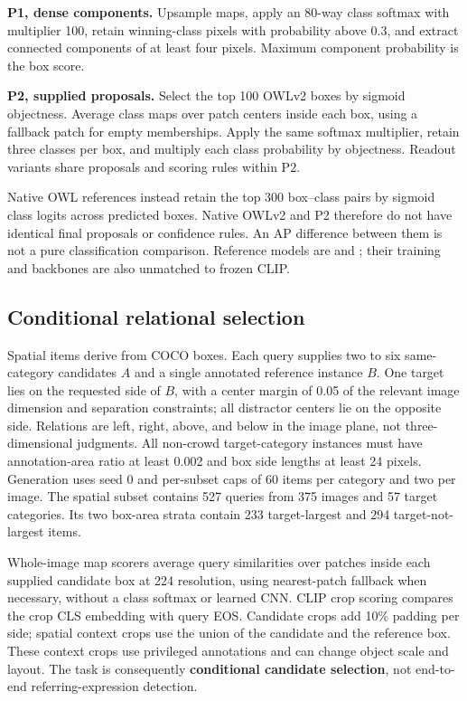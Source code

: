 \documentclass[10pt,twocolumn,letterpaper]{article}
\begin{document}
\textbf{P1, dense components.} Upsample maps, apply an 80-way class
softmax with multiplier 100, retain winning-class pixels with
probability above 0.3, and extract connected components of at least four
pixels. Maximum component probability is the box score.

\textbf{P2, supplied proposals.} Select the top 100 OWLv2 boxes by
sigmoid objectness. Average class maps over patch centers inside each
box, using a fallback patch for empty memberships. Apply the same
softmax multiplier, retain three classes per box, and multiply each
class probability by objectness. Readout variants share proposals and
scoring rules within P2.

Native OWL references instead retain the top 300 box--class pairs by
sigmoid class logits across predicted boxes. Native OWLv2 and P2
therefore do not have identical final proposals or confidence rules. An
AP difference between them is not a pure classification comparison.
Reference models are  and
; their training and
backbones are also unmatched to frozen CLIP.

\subsection{Conditional relational
selection}\label{conditional-relational-selection}

Spatial items derive from COCO boxes. Each query supplies two to six
same-category candidates \(A\) and a single annotated reference instance
\(B\). One target lies on the requested side of \(B\), with a center
margin of 0.05 of the relevant image dimension and separation
constraints; all distractor centers lie on the opposite side. Relations
are left, right, above, and below in the image plane, not
three-dimensional judgments. All non-crowd target-category instances
must have annotation-area ratio at least 0.002 and box side lengths at
least 24 pixels. Generation uses seed 0 and per-subset caps of 60 items
per category and two per image. The spatial subset contains 527 queries
from 375 images and 57 target categories. Its two box-area strata
contain 233 target-largest and 294 target-not-largest items.

Whole-image map scorers average query similarities over patches inside
each supplied candidate box at 224 resolution, using nearest-patch
fallback when necessary, without a class softmax or learned CNN. CLIP
crop scoring compares the crop CLS embedding with query EOS. Candidate
crops add 10\% padding per side; spatial context crops use the union of
the candidate and the reference box. These context crops use privileged
annotations and can change object scale and layout. The task is
consequently \textbf{conditional candidate selection}, not end-to-end
referring-expression detection.
\end{document}
